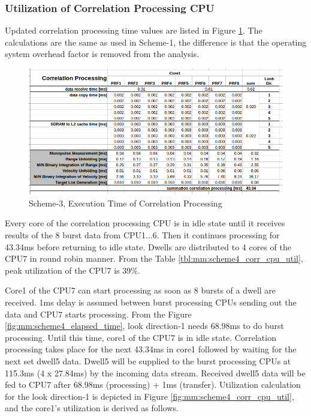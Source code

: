 \subsubsection{Utilization of Correlation Processing CPU}
\label{mm:SSS:scheme4:corr_cpu_util}
Updated correlation processing time values are listed in Figure \ref{fig:mm:scheme4_corr_calc}. The calculations are the same as used in Scheme-1, the difference is that the operating system overhead factor is removed from the analysis.
\begin{figure}[h!]
	\centering
	\includegraphics[width=160mm]{figures/scheme4_corr_proc}
	\caption{Scheme-3, Execution Time of Correlation Processing}
	\label{fig:mm:scheme4_corr_calc}
\end{figure}

Every core of the correlation processing CPU is in idle state until it receives results of the 8 burst data from CPU1...6. Then it continues processing for 43.34ms before returning to idle state. Dwells are distributed to 4 cores of the CPU7 in round robin manner. From the Table \ref{tbl:mm:scheme4_corr_cpu_util}, peak utilization of the CPU7 is 39\%. 

Core1 of the CPU7 can start processing as soon as 8 bursts of a dwell are received. 1ms delay is assumed between burst processing CPUs sending out the data and CPU7 starts processing. From the Figure \ref{fig:mm:scheme4_elapsed_time}, look direction-1 needs 68.98ms to do burst processing. Until this time, core1 of the CPU7 is in idle state. Correlation processing takes place for the next 43.34ms in core1 followed by waiting for the next set dwell5 data. Dwell5 will be supplied to the burst processing CPUs at 115.3ms (4 x 27.84ms) by the incoming data stream. Received dwell5 data will be fed to CPU7 after 68.98ms (processing) + 1ms (transfer). Utilization calculation for the look direction-1 is depicted in Figure \ref{fig:mm:scheme4_corr_cpu_util}, and the core1's utilization is derived as follows.

